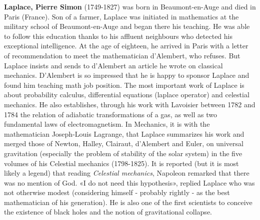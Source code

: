\textbf{Laplace, Pierre Simon} (1749-1827) was born in Beaumont-en-Auge and died in Paris (France). Son of a farmer, Laplace was initiated in mathematics at the military school of Beaumont-en-Auge and began there his teaching. He was able to follow this education thanks to his affluent neighbours who detected his exceptional intelligence. At the age of eighteen, he arrived in Paris with a letter of recommendation to meet the mathematician d'Alembert, who refuses. But Laplace insists and sends to d'Alembert an article he wrote on classical mechanics. D'Alembert is so impressed that he is happy to sponsor Laplace and found him teaching math job position. The most important work of Laplace is about probability calculus, differential equations (laplace operator) and celestial mechanics. He also establishes, through his work with Lavoisier between 1782 and 1784 the relation of adiabatic transformations of a gas, as well as two fundamental laws of electromagnetism. In Mechanics, it is with the mathematician Joseph-Louis Lagrange, that Laplace summarizes his work and merged those of Newton, Halley, Clairaut, d'Alembert and Euler, on universal gravitation (especially the problem of stability of the solar system) in the five volumes of his Celestial mechanics (1798-1825). It is reported (but it is most likely a legend) that reading \textit{Celestial mechanics}, Napoleon remarked that there was no mention of God. «I do not need this hypothesis», replied Laplace who was not otherwise modest (considering himself - probably rightly - as the best mathematician of his generation). He is also one of the first scientists to conceive the existence of black holes and the notion of gravitational collapse.

